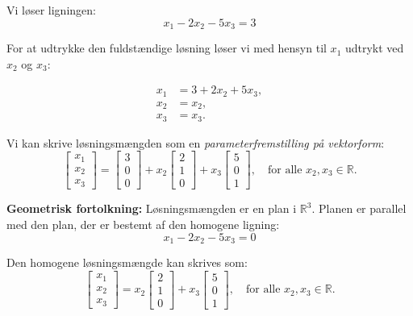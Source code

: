 \begin{solution}
        Vi løser ligningen:
        \[
        x_1 - 2 x_2 - 5 x_3 = 3
        \]
        
        For at udtrykke den fuldstændige løsning løser vi med hensyn til \( x_1 \) udtrykt ved \( x_2 \) og \( x_3 \):
    
        \[
        \begin{aligned}
        x_1 &= 3 + 2x_2 + 5x_3, \\
        x_2 &= x_2, \\
        x_3 &= x_3.
        \end{aligned}
        \]
        
        Vi kan skrive løsningsmængden som en \textit{parameterfremstilling på vektorform}:
        \[
        \begin{bmatrix}
        x_1 \\
        x_2 \\
        x_3
        \end{bmatrix}
        =
        \begin{bmatrix}
        3 \\
        0 \\
        0
        \end{bmatrix}
        +
        x_2
        \begin{bmatrix}
        2 \\
        1 \\
        0
        \end{bmatrix}
        +
        x_3
        \begin{bmatrix}
        5 \\
        0 \\
        1
        \end{bmatrix}, \quad \text{for alle } x_2, x_3 \in \mathbb{R}.
        \]
        
        \textbf{Geometrisk fortolkning:} Løsningsmængden er en plan i \(\mathbb{R}^3\). Planen er parallel med den plan, der er bestemt af den homogene ligning:
        \[
        x_1 - 2 x_2 - 5 x_3 = 0
        \]
        
        Den homogene løsningsmængde kan skrives som:
        \[
        \begin{bmatrix}
        x_1 \\
        x_2 \\
        x_3
        \end{bmatrix}
        =
        x_2
        \begin{bmatrix}
        2 \\
        1 \\
        0
        \end{bmatrix}
        +
        x_3
        \begin{bmatrix}
        5 \\
        0 \\
        1
        \end{bmatrix}, \quad \text{for alle } x_2, x_3 \in \mathbb{R}.
        \]
        

\end{solution}

